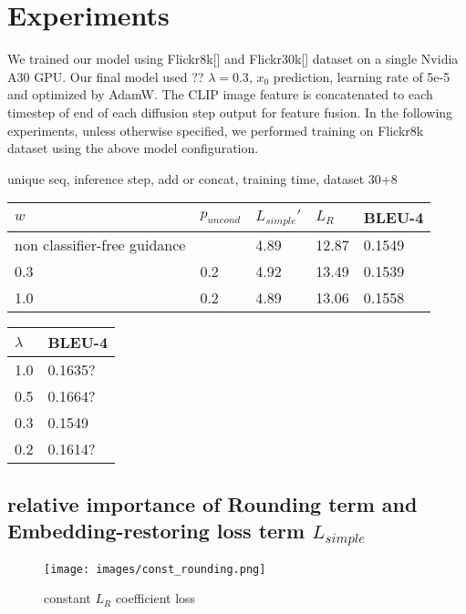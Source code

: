 \documentclass{article}
\begin{document}
\section{Experiments}
We trained our model using Flickr8k[] and Flickr30k[] dataset on a single Nvidia A30 GPU. Our final model used ?? $\lambda = 0.3$, $x_0$ prediction, learning rate of 5e-5 and optimized by AdamW. The CLIP image feature is concatenated to each timestep of end of each diffusion step output for feature fusion. In the following experiments, unless otherwise specified, we performed training on Flickr8k dataset using the above model configuration.

unique seq, inference step, add or concat, training time, dataset 30+8

\begin{minipage}[c]{0.5\textwidth}
\centering
\begin{tabular}{lllll}
\toprule
$w$ & $p_{uncond}$ & $L_{simple}'$ & $L_R$ & BLEU-4 \\
\midrule
non classifier-free guidance & & 4.89 & 12.87 & 0.1549 \\
0.3 & 0.2 & 4.92 & 13.49 & 0.1539 \\
1.0 & 0.2 & 4.89 & 13.06 & 0.1558
\bottomrule
\end{tabular}
\label{tab:table}
\end{minipage}
\begin{minipage}[c]{0.5\textwidth}
\centering
\begin{tabular}{ll}
\toprule
$\lambda$     & BLEU-4 \\
\midrule
1.0     & 0.1635? \\
0.5     & 0.1664? \\
0.3     & 0.1549 \\
0.2     & 0.1614?
\bottomrule
\end{tabular}
\label{tab:table}
\end{minipage}
\subsection{relative importance of Rounding term and Embedding-restoring loss term $L_{simple}$}

\begin{figure}
  \centering
  \texttt{[image: images/const\_rounding.png]}
  \caption{constant $L_R$ coefficient loss}
  \label{fig:fig1}
\end{figure}
\end{document}
